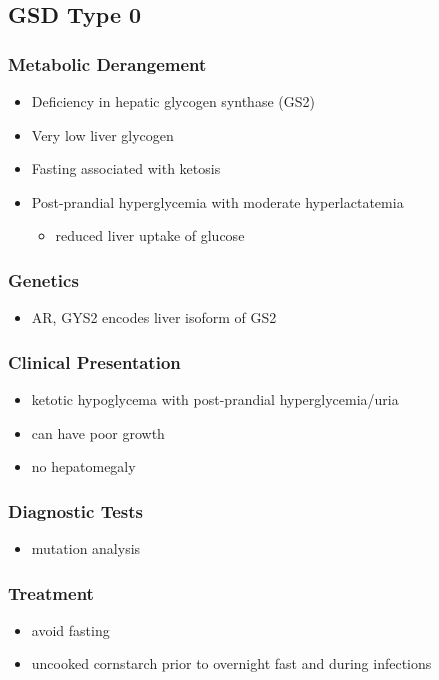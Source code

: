 \documentclass{scrartcl}
\begin{document}
\subsection{GSD Type 0}
\label{sec:org762cb56}
\subsubsection{Metabolic Derangement}
\label{sec:org354c3f0}
\begin{itemize}
\item Deficiency in hepatic glycogen synthase (GS2)
\item Very low liver glycogen
\item Fasting associated with ketosis
\item Post-prandial hyperglycemia with moderate hyperlactatemia
\begin{itemize}
\item reduced liver uptake of glucose
\end{itemize}
\end{itemize}

\subsubsection{Genetics}
\label{sec:orgc42d3a1}
\begin{itemize}
\item AR, GYS2 encodes liver isoform of GS2
\end{itemize}

\subsubsection{Clinical Presentation}
\label{sec:org5b3d958}
\begin{itemize}
\item ketotic hypoglycema with post-prandial hyperglycemia/uria
\item can have poor growth
\item no hepatomegaly
\end{itemize}

\subsubsection{Diagnostic Tests}
\label{sec:org8274243}
\begin{itemize}
\item mutation analysis
\end{itemize}
\subsubsection{Treatment}
\label{sec:org3f0d54b}
\begin{itemize}
\item avoid fasting
\item uncooked cornstarch prior to overnight fast and during infections
\end{itemize}
\end{document}
